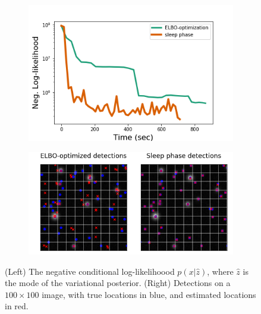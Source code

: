 \begin{figure}[!htb]
    \centering
    \begin{subfigure}[!t]{0.4\textwidth}
    \centering
    \includegraphics[width=\textwidth]{figures/optim_path_compare_100x100.png}
    \end{subfigure}
    \begin{subfigure}[!t]{0.59\textwidth}
    \centering
    \includegraphics[width=\textwidth]{figures/optim_path_detect_compare_100x100.png}
    \end{subfigure}
    \caption{(Left) The negative conditional log-likelihoood $p(x|\hat z)$, where $\hat z$ is the mode of the variational posterior. (Right) Detections on a $100\times 100$ image, with true locations in blue, and estimated locations in red. }
    \label{fig:sim_data100x100}
\end{figure}
